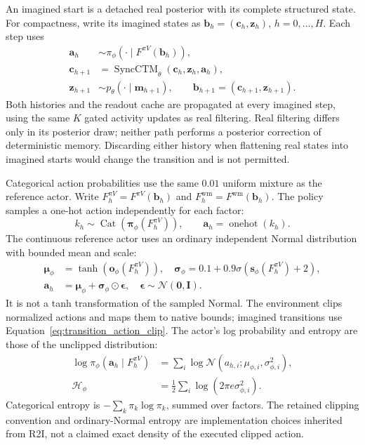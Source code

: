 \documentclass{article}
\begin{document}
An imagined start is a detached real posterior with its complete structured state. For compactness, write its imagined states as $\mathbf b_h=(\mathbf c_h,\mathbf z_h)$, $h=0,\ldots,H$. Each step uses
\begin{align}
\mathbf a_h&\sim\pi_\phi(\cdot\mid F^{\pi V}(\mathbf b_h)),
\label{eq:imagined_actor}\\
\mathbf c_{h+1}&=\operatorname{SyncCTM}_\theta(\mathbf c_h,\mathbf z_h,\mathbf a_h),
\label{eq:imagined_context}\\
\mathbf z_{h+1}&\sim p_\theta(\cdot\mid\mathbf m_{h+1}),\qquad
\mathbf b_{h+1}=(\mathbf c_{h+1},\mathbf z_{h+1}).
\label{eq:imagined_latent}
\end{align}
Both histories and the readout cache are propagated at every imagined step, using the same $K$ gated activity updates as real filtering. Real filtering differs only in its posterior draw; neither path performs a posterior correction of deterministic memory. Discarding either history when flattening real states into imagined starts would change the transition and is not permitted.

Categorical action probabilities use the same $0.01$ uniform mixture as the reference actor. Write $F_h^{\pi V}=F^{\pi V}(\mathbf b_h)$ and $F_h^{\mathrm{wm}}=F^{\mathrm{wm}}(\mathbf b_h)$. The policy samples a one-hot action independently for each factor:
\begin{equation}
k_h\sim\operatorname{Cat}(\boldsymbol\pi_\phi(F_h^{\pi V})),\qquad
\mathbf a_h=\operatorname{onehot}(k_h).
\label{eq:discrete_action_sample}
\end{equation}
The continuous reference actor uses an ordinary independent Normal distribution with bounded mean and scale:
\begin{align}
\boldsymbol\mu_\phi&=\tanh(\mathbf o_\phi(F_h^{\pi V})),\quad
\boldsymbol\sigma_\phi=0.1+0.9\sigma(\mathbf s_\phi(F_h^{\pi V})+2),\\
\mathbf a_h&=\boldsymbol\mu_\phi+\boldsymbol\sigma_\phi\odot\boldsymbol\epsilon,
\quad\boldsymbol\epsilon\sim\mathcal N(\mathbf0,\mathbf I).
\label{eq:continuous_action_sample}
\end{align}
It is not a tanh transformation of the sampled Normal. The environment clips normalized actions and maps them to native bounds; imagined transitions use Equation~\eqref{eq:transition_action_clip}. The actor's log probability and entropy are those of the unclipped distribution:
\begin{equation}
\begin{aligned}
\log\pi_\phi(\mathbf a_h\mid F_h^{\pi V})&=\sum_i\log\mathcal N(a_{h,i};\mu_{\phi,i},\sigma_{\phi,i}^2),\\
\mathcal H_\phi&=\tfrac12\sum_i\log(2\pi e\sigma_{\phi,i}^2).
\end{aligned}
\label{eq:continuous_logprob}
\end{equation}
Categorical entropy is $-\sum_k\pi_k\log\pi_k$, summed over factors. The retained clipping convention and ordinary-Normal entropy are implementation choices inherited from R2I, not a claimed exact density of the executed clipped action.
\end{document}
